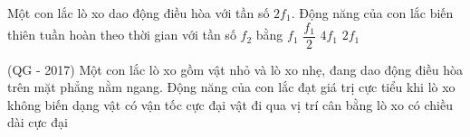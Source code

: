 \begin{ex} %
Một con lắc lò xo dao động điều hòa với tần số $2f_1$. Động năng của con lắc biến thiên tuần hoàn theo thời gian với tần số $f_2$ bằng
\choice
{$f_1$}
{$\dfrac{f_1}{2}$}
{\True $4f_1$}
{$2f_1$}
\end{ex} 



\begin{ex} %
(QG - 2017) Một con lắc lò xo gồm vật nhỏ và lò xo nhẹ, đang dao động điều hòa trên mặt phẳng nằm ngang. Động năng của con lắc đạt giá trị cực tiểu khi
\choice
{lò xo không biến dạng}
{vật có vận tốc cực đại}
{vật đi qua vị trí cân bằng}
{\True lò xo có chiều dài cực đại}
\end{ex} 



